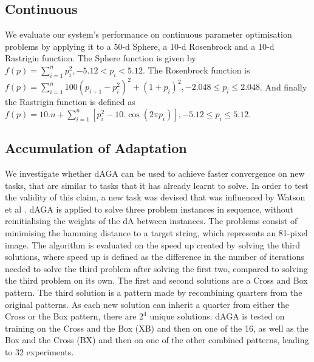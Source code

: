 \documentclass[runningheads,a4paper]{llncs}
\begin{document}
\subsection{Continuous}

We evaluate our system's performance on continuous parameter optimisation problems by applying it to a 50-d Sphere, a 10-d Rosenbrock and a 10-d Rastrigin function. The Sphere function is given by $f(p) = \sum_{i=1}^{n} p_i^{2}, -5.12<p_{i}<5.12$. The Rosenbrock function is $f(p) = \sum_{i=1}^{n} 100(p_{i+1}-p_i^{2})^2 + (1+p_i)^2, -2.048 \le p_{i} \le 2.048$. And finally the Rastrigin function is defined as $f(p) = 10.n + \sum_{i=1}^n \left[p_i^2 - 10.\cos(2 \pi p_i)\right], -5.12 \le p_{i} \le 5.12$. 

\subsection{Accumulation of Adaptation}
We investigate whether dAGA can be used to achieve faster convergence on new tasks, that are similar to tasks that it has already learnt to solve. In order to test the validity of this claim, a new task was devised that was influenced by Watson et al \cite{watson2014evolution}. dAGA is applied to solve three problem instances in sequence, without reinitialising the weights of the dA between instances. The problems consist of minimising the hamming distance to a target string, which represents an 81-pixel image. The algorithm is evaluated on the speed up created by solving the third solutions, where speed up is defined as the difference in the number of iterations needed to solve the third problem after solving the first two, compared to solving the third problem on its own. The first and second solutions are a Cross and Box pattern. The third solution is a pattern made by recombining quarters from the original patterns. As each new solution can inherit a quarter from either the Cross or the Box pattern, there are \(2^4\) unique solutions. dAGA is tested on training on the Cross and the Box (XB) and then on one of the 16, as well as the Box and the Cross (BX) and then on one of the other combined patterns, leading to 32 experiments.
\end{document}
